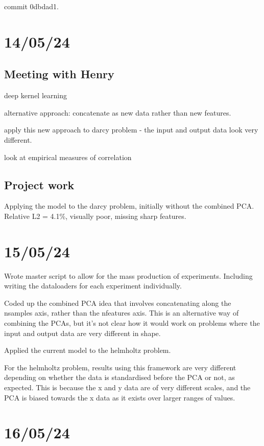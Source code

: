 \documentclass[11pt,a4paper]{article}
\begin{document}
commit 0dbdad1.

\section{14/05/24}

\subsection{Meeting with Henry}

deep kernel learning

alternative approach: concatenate as new data rather than new features.

apply this new approach to darcy problem - the input and output data look very different.

look at empirical measures of correlation

\subsection{Project work}

Applying the model to the darcy problem, initially without the combined PCA.
Relative L2 = 4.1\%, visually poor, missing sharp features.

\section{15/05/24}

Wrote master script to allow for the mass production of experiments.
Including writing the dataloaders for each experiment individually.

Coded up the combined PCA idea that involves concatenating along the nsamples axis, rather than the nfeatures axis.
This is an alternative way of combining the PCAs, but it's not clear how it would work on problems where the input and output data are very different in shape.

Applied the current model to the helmholtz problem.

For the helmholtz problem, results using this framework are very different depending on whether the data is standardised before the PCA or not, as expected.
This is because the x and y data are of very different scales, and the PCA is biased towards the x data as it exists over larger ranges of values.

\section{16/05/24}
\end{document}

